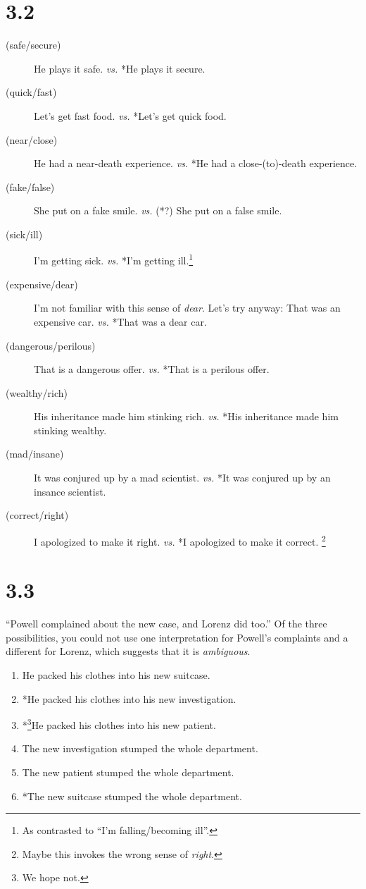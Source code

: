 \documentclass[12pt]{article}
\begin{document}
\section*{3.2}
\begin{description}
\item[(safe/secure)] He plays it safe. \textit{vs.} *He plays it secure.
\item[(quick/fast)] Let's get fast food.  \textit{vs.} *Let's get
quick food.
\item[(near/close)] He had a near-death experience.  \textit{vs.} *He
had a close-(to)-death experience.
\item[(fake/false)] She put on a fake smile.  \textit{vs.} (*?) She put on a
false smile.
\item[(sick/ill)] I'm getting sick.  \textit{vs.} *I'm getting
ill.\footnote{As contrasted to ``I'm falling/becoming ill''.}
\item[(expensive/dear)]  I'm not familiar with this sense of
\textit{dear}.  Let's try anyway:  That was an expensive car.
\textit{vs.} *That was a dear car.
\item[(dangerous/perilous)] That is a dangerous offer. \textit{vs.}
*That is a perilous offer.
\item[(wealthy/rich)] His inheritance made him stinking rich.
\textit{vs.} *His inheritance made him stinking wealthy.
\item[(mad/insane)] It was conjured up by a mad scientist.  \textit{vs.}
*It was conjured up by an insance scientist.
\item[(correct/right)] I apologized to make it right. \textit{vs.} *I
apologized to make it correct.  \footnote{Maybe this invokes the wrong
sense of \textit{right}.}
\end{description}

\section*{3.3}
``Powell complained about the new case, and Lorenz did too.''  Of the
three possibilities, you could not use one interpretation for Powell's
complaints and a different for Lorenz, which suggests that it is
\textit{ambiguous}.

\begin{enumerate}
\item He packed his clothes into his new suitcase.
\item *He packed his clothes into his new investigation.
\item *\footnote{We hope not.}He packed his clothes into his new patient.
\item The new investigation stumped the whole department.
\item The new patient stumped the whole department.
\item *The new suitcase stumped the whole department.
\end{enumerate}
\end{document}
